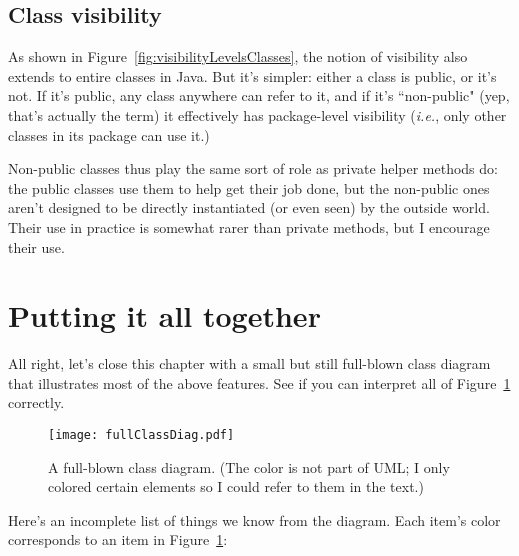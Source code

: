 \subsection{Class visibility}

As shown in Figure~\ref{fig:visibilityLevelsClasses}, the notion of visibility
also extends to entire classes in Java. But it's simpler: either a class is
public, or it's not. If it's public, any class anywhere can refer to it, and
if it's ``non-public" (yep, that's actually the term) it effectively has
package-level visibility (\textit{i.e.}, only other classes in its package can
use it.)

Non-public classes thus play the same sort of role as private helper methods
do: the public classes use them to help get their job done, but the non-public
ones aren't designed to be directly instantiated (or even seen) by the outside
world. Their use in practice is somewhat rarer than private methods, but I
encourage their use.


\section{Putting it all together}

All right, let's close this chapter with a small but still full-blown class
diagram that illustrates most of the above features. See if you can interpret
all of Figure~\ref{fig:fullClassDiag} correctly.

\begin{figure}[ht]
\centering
\texttt{[image: fullClassDiag.pdf]}   %
\caption{A full-blown class diagram. (The color is not part of UML; I only
colored certain elements so I could refer to them in the text.)}
\label{fig:fullClassDiag}
\end{figure}

Here's an incomplete list of things we know from the diagram. Each item's
color corresponds to an item in Figure~\ref{fig:fullClassDiag}:

